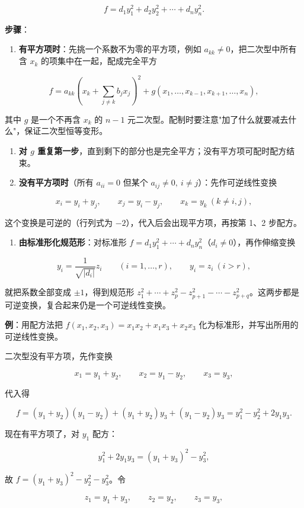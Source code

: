 \documentclass[11pt,openany,UTF8]{ctexbook}
\begin{document}
\[f=d_1y_1^2+d_2y_2^2+\cdots+d_ny_n^2 .\]

\textbf{步骤}：

\begin{enumerate}
\item \textbf{有平方项时}：先挑一个系数不为零的平方项，例如 $a_{kk}\neq0$，把二次型中所有含 $x_k$ 的项集中在一起，配成完全平方
\end{enumerate}
\[f=a_{kk}\left(x_k+\sum_{j\neq k}b_jx_j\right)^2+g(x_1,\dots,x_{k-1},x_{k+1},\dots,x_n),\]

其中 $g$ 是一个不再含 $x_k$ 的 $n-1$ 元二次型。配制时要注意"加了什么就要减去什么"，保证二次型恒等变形。

\begin{enumerate}
\item \textbf{对 $g$ 重复第一步}，直到剩下的部分也是完全平方；没有平方项可配时配方结束。
\item \textbf{没有平方项时}（所有 $a_{ii}=0$ 但某个 $a_{ij}\neq0,\ i\neq j$）：先作可逆线性变换
\end{enumerate}
\[x_i=y_i+y_j,\qquad x_j=y_i-y_j,\qquad x_k=y_k\ (k\neq i,j),\]

这个变换是可逆的（行列式为 $-2$），代入后会出现平方项，再按第 1、2 步配方。

\begin{enumerate}
\item \textbf{由标准形化规范形}：对标准形 $f=d_1y_1^2+\cdots+d_ny_n^2$（$d_i\neq0$），再作伸缩变换
\end{enumerate}
\[y_i=\frac{1}{\sqrt{\vert d_i\vert}}z_i\qquad(i=1,\dots,r),\qquad y_i=z_i\ (i>r),\]

就把系数全部变成 $\pm1$，得到规范形 $z_1^2+\cdots+z_p^2-z_{p+1}^2-\cdots-z_{p+q}^2$。这两步都是可逆变换，复合起来仍是一个可逆线性变换。

\textbf{例}：用配方法把 $f(x_1,x_2,x_3)=x_1x_2+x_1x_3+x_2x_3$ 化为标准形，并写出所用的可逆线性变换。

二次型没有平方项，先作变换

\[x_1=y_1+y_2,\qquad x_2=y_1-y_2,\qquad x_3=y_3,\]

代入得

\[f=(y_1+y_2)(y_1-y_2)+(y_1+y_2)y_3+(y_1-y_2)y_3=y_1^2-y_2^2+2y_1y_3 .\]

现在有平方项了，对 $y_1$ 配方：

\[y_1^2+2y_1y_3=(y_1+y_3)^2-y_3^2,\]

故 $f=(y_1+y_3)^2-y_2^2-y_3^2$。令

\[z_1=y_1+y_3,\qquad z_2=y_2,\qquad z_3=y_3,\]
\end{document}
